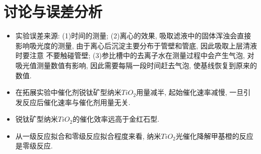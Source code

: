 \documentclass[a4paper]{article}
\begin{document}
\section{讨论与误差分析}
\begin{itemize}
	\item 实验误差来源: (1)时间的测量; (2)离心的效果, 
	吸取滤液中的固体浑浊会直接影响吸光度的测量, 
	由于离心后沉淀主要分布于管壁和管底, 因此吸取上层清液时要注意
	不要触碰管壁; (3)参比槽中的去离子水在测量过程中会产生气泡, 
	对吸光值测量数值有影响, 因此需要每隔一段时间赶去气泡, 
	使基线恢复到原来的数值.
	\item 在拓展实验中催化剂锐钛矿型纳米$TiO_{2}$用量减半, 
	起始催化速率减慢, 一旦引发反应后催化速率与催化剂用量无关. 
	\item 锐钛矿型纳米$TiO_{2}$的催化效率远高于金红石型.
	\item 从一级反应拟合和零级反应拟合程度来看, 
	纳米$TiO_{2}$光催化降解甲基橙的反应是零级反应.
\end{itemize}
\end{document}
